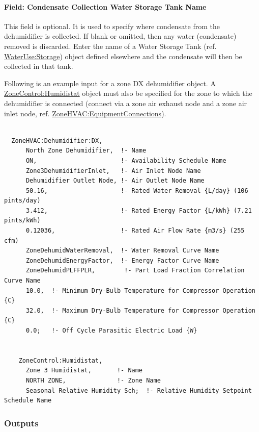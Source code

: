 \paragraph{Field: Condensate Collection Water Storage Tank Name}\label{field-condensate-collection-water-storage-tank-name-000}

This field is optional. It is used to specify where condensate from the dehumidifier is collected. If blank or omitted, then any water (condensate) removed is discarded. Enter the name of a Water Storage Tank (ref. \hyperref[waterusestorage]{WaterUse:Storage}) object defined elsewhere and the condensate will then be collected in that tank.

Following is an example input for a zone DX dehumidifier object. A \hyperref[zonecontrolhumidistat]{ZoneControl:Humidistat} object must also be specified for the zone to which the dehumidifier is connected (connect via a zone air exhaust node and a zone air inlet node, ref. \hyperref[zonehvacequipmentconnections]{ZoneHVAC:EquipmentConnections}).

\begin{lstlisting}

  ZoneHVAC:Dehumidifier:DX,
      North Zone Dehumidifier,  !- Name
      ON,                       !- Availability Schedule Name
      Zone3DehumidifierInlet,   !- Air Inlet Node Name
      Dehumidifier Outlet Node, !- Air Outlet Node Name
      50.16,                    !- Rated Water Removal {L/day} (106 pints/day)
      3.412,                    !- Rated Energy Factor {L/kWh} (7.21 pints/kWh)
      0.12036,                  !- Rated Air Flow Rate {m3/s} (255 cfm)
      ZoneDehumidWaterRemoval,  !- Water Removal Curve Name
      ZoneDehumidEnergyFactor,  !- Energy Factor Curve Name
      ZoneDehumidPLFFPLR,        !- Part Load Fraction Correlation Curve Name
      10.0,  !- Minimum Dry-Bulb Temperature for Compressor Operation {C}
      32.0,  !- Maximum Dry-Bulb Temperature for Compressor Operation {C}
      0.0;   !- Off Cycle Parasitic Electric Load {W}


    ZoneControl:Humidistat,
      Zone 3 Humidistat,       !- Name
      NORTH ZONE,              !- Zone Name
      Seasonal Relative Humidity Sch;  !- Relative Humidity Setpoint Schedule Name
\end{lstlisting}

\subsubsection{Outputs}\label{outputs-10-008}


